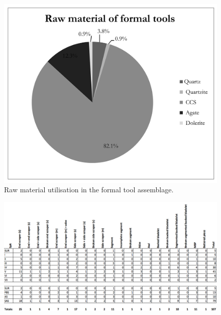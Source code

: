 		\begin{figure} %
			\includegraphics[width=\linewidth]{figures/Forssman-Figure06}
			\caption{Raw material utilisation in the formal tool assemblage.}
			\label{fig:Forssman-Figure06}
		\end{figure}
	
	\begin{figure} %
		\includegraphics[width=\linewidth]{figures/Forssman-Table03}
		\label{fig:Forssman-Table03}
	\end{figure}
   
